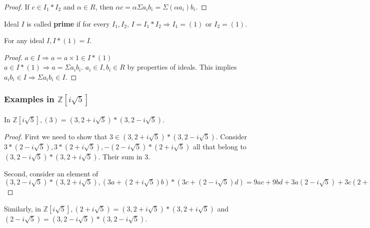 \begin{proof}
  If $c \in I_{1} * I_{2}$ and $\alpha \in R$, then $\alpha c = \alpha \Sigma a_{i} b_{i} = \Sigma (\alpha a_{i}) b_{i}$.
\end{proof}
\begin{definition} \label{def:primeideal}
  Ideal $I$ is called \textbf{prime} if for every $I_{1}, I_{2}$, $I = I_{1} * I_{2} \Rightarrow I_{1} = (1)$ or $I_{2} = (1)$.
\end{definition}
\begin{lemma} \label{lem:identityideal}
  For any ideal $I, I * (1) = I$.
\end{lemma}
\begin{proof} \label{proof:identityideal}
  $a \in I \Rightarrow a = a \times 1 \in I * (1)$ \\
  $a \in I * (1) \Rightarrow a = \Sigma a_{i} b_{i}$.
  $a_{i} \in I, b_{i} \in R$ by properties of ideals.
  This implies $a_{i} b_{i} \in I \Rightarrow \Sigma a_{i} b_{i} \in I$.
\end{proof}
\subsubsection{Examples in $\mathbb{Z}[i \sqrt{5}]$ }
In $\mathbb{Z}[ i \sqrt{5}], (3) = (3, 2 + i \sqrt{5}) * (3, 2 - i \sqrt{5})$.
\begin{proof}
  First we need to show that $3 \in (3, 2 + i \sqrt{5}) * (3, 2 - i \sqrt{5})$.
  Consider $3 * (2 - i \sqrt{5}), 3 * (2 + i \sqrt{5}), -(2 - i \sqrt{5}) * (2 + i \sqrt{5})$ all that belong to $(3, 2 - i \sqrt{5}) * (3, 2 + i \sqrt{5})$.
  Their sum in $3$.
  \par
  Second, consider an element of $(3, 2 - i \sqrt{5}) * (3, 2 + i \sqrt{5}), (3a + (2 + i \sqrt{5})b) * (3c + (2 - i \sqrt{5})d) = 9ac + 9bd + 3a(2 - i \sqrt{5}) + 3c(2 + i \sqrt{5}) \in (3).$
\end{proof}
Similarly, in $\mathbb{Z}[i \sqrt{5}], (2 + i \sqrt{5}) = (3, 2 + i \sqrt{5}) * (3, 2 + i \sqrt{5})$ and $(2 - i \sqrt{5}) = (3, 2 - i \sqrt{5}) * (3, 2 - i \sqrt{5})$.

